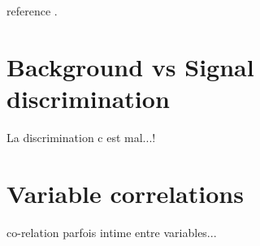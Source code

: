 \label{sec:unchapitre}

reference \cite{CMS2015}.

\section{Background vs Signal discrimination}

La discrimination c est mal...!

\section{Variable correlations}

co-relation parfois intime entre variables...

